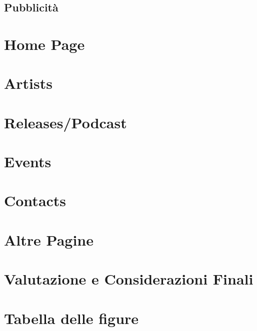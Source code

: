 \documentclass[10pt,a4paper]{article}
\begin{document}
\subsection{Pubblicità}
\section{Home Page}
\section{Artists}
\section{Releases/Podcast}
\section{Events}
\section{Contacts}
\section{Altre Pagine}
\section{Valutazione e Considerazioni Finali}
\appendix
\section{Tabella delle figure}
\end{document}
